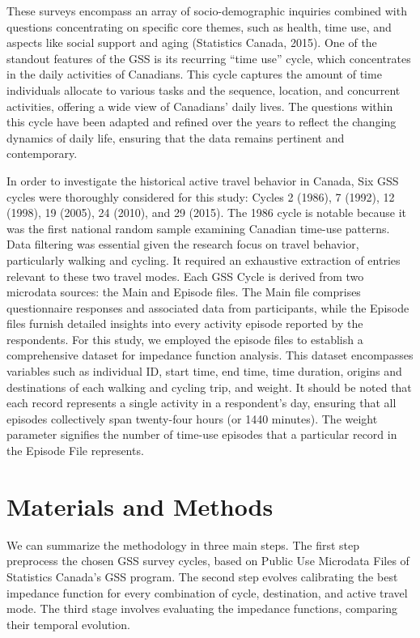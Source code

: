 \documentclass[preprint, 3p,
authoryear]{elsarticle} %
\begin{document}
These surveys encompass an array of socio-demographic inquiries combined
with questions concentrating on specific core themes, such as health,
time use, and aspects like social support and aging (Statistics Canada,
2015). One of the standout features of the GSS is its recurring ``time
use'' cycle, which concentrates in the daily activities of Canadians.
This cycle captures the amount of time individuals allocate to various
tasks and the sequence, location, and concurrent activities, offering a
wide view of Canadians' daily lives. The questions within this cycle
have been adapted and refined over the years to reflect the changing
dynamics of daily life, ensuring that the data remains pertinent and
contemporary.

In order to investigate the historical active travel behavior in Canada,
Six GSS cycles were thoroughly considered for this study: Cycles 2
(1986), 7 (1992), 12 (1998), 19 (2005), 24 (2010), and 29 (2015). The
1986 cycle is notable because it was the first national random sample
examining Canadian time-use patterns. Data filtering was essential given
the research focus on travel behavior, particularly walking and cycling.
It required an exhaustive extraction of entries relevant to these two
travel modes. Each GSS Cycle is derived from two microdata sources: the
Main and Episode files. The Main file comprises questionnaire responses
and associated data from participants, while the Episode files furnish
detailed insights into every activity episode reported by the
respondents. For this study, we employed the episode files to establish
a comprehensive dataset for impedance function analysis. This dataset
encompasses variables such as individual ID, start time, end time, time
duration, origins and destinations of each walking and cycling trip, and
weight. It should be noted that each record represents a single activity
in a respondent's day, ensuring that all episodes collectively span
twenty-four hours (or 1440 minutes). The weight parameter signifies the
number of time-use episodes that a particular record in the Episode File
represents.

\hypertarget{materials-and-methods}{%
\section{Materials and Methods}\label{materials-and-methods}}

We can summarize the methodology in three main steps. The first step
preprocess the chosen GSS survey cycles, based on Public Use Microdata
Files of Statistics Canada's GSS program. The second step evolves
calibrating the best impedance function for every combination of cycle,
destination, and active travel mode. The third stage involves evaluating
the impedance functions, comparing their temporal evolution.
\end{document}
